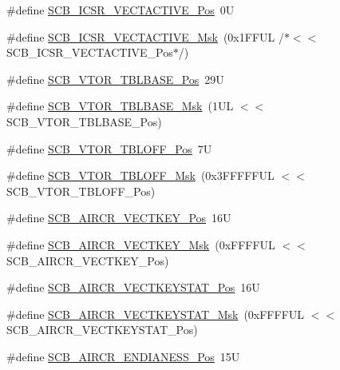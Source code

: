 \begin{DoxyCompactItemize}
\item 
\#define \hyperlink{group___c_m_s_i_s___s_c_b_gae4f602c7c5c895d5fb687b71b0979fc3}{S\-C\-B\-\_\-\-I\-C\-S\-R\-\_\-\-V\-E\-C\-T\-A\-C\-T\-I\-V\-E\-\_\-\-Pos}~0\-U
\item 
\#define \hyperlink{group___c_m_s_i_s___s_c_b_ga5533791a4ecf1b9301c883047b3e8396}{S\-C\-B\-\_\-\-I\-C\-S\-R\-\_\-\-V\-E\-C\-T\-A\-C\-T\-I\-V\-E\-\_\-\-Msk}~(0x1\-F\-F\-U\-L /$\ast$$<$$<$ S\-C\-B\-\_\-\-I\-C\-S\-R\-\_\-\-V\-E\-C\-T\-A\-C\-T\-I\-V\-E\-\_\-\-Pos$\ast$/)
\item 
\#define \hyperlink{group___c_m_s_i_s___s_c_b_gad9720a44320c053883d03b883b955751}{S\-C\-B\-\_\-\-V\-T\-O\-R\-\_\-\-T\-B\-L\-B\-A\-S\-E\-\_\-\-Pos}~29\-U
\item 
\#define \hyperlink{group___c_m_s_i_s___s_c_b_ga778dd0ba178466b2a8877a6b8aa345ee}{S\-C\-B\-\_\-\-V\-T\-O\-R\-\_\-\-T\-B\-L\-B\-A\-S\-E\-\_\-\-Msk}~(1\-U\-L $<$$<$ S\-C\-B\-\_\-\-V\-T\-O\-R\-\_\-\-T\-B\-L\-B\-A\-S\-E\-\_\-\-Pos)
\item 
\#define \hyperlink{group___c_m_s_i_s___s_c_b_gac6a55451ddd38bffcff5a211d29cea78}{S\-C\-B\-\_\-\-V\-T\-O\-R\-\_\-\-T\-B\-L\-O\-F\-F\-\_\-\-Pos}~7\-U
\item 
\#define \hyperlink{group___c_m_s_i_s___s_c_b_ga75e395ed74042923e8c93edf50f0996c}{S\-C\-B\-\_\-\-V\-T\-O\-R\-\_\-\-T\-B\-L\-O\-F\-F\-\_\-\-Msk}~(0x3\-F\-F\-F\-F\-F\-U\-L $<$$<$ S\-C\-B\-\_\-\-V\-T\-O\-R\-\_\-\-T\-B\-L\-O\-F\-F\-\_\-\-Pos)
\item 
\#define \hyperlink{group___c_m_s_i_s___s_c_b_gaaa27c0ba600bf82c3da08c748845b640}{S\-C\-B\-\_\-\-A\-I\-R\-C\-R\-\_\-\-V\-E\-C\-T\-K\-E\-Y\-\_\-\-Pos}~16\-U
\item 
\#define \hyperlink{group___c_m_s_i_s___s_c_b_ga90c7cf0c490e7ae55f9503a7fda1dd22}{S\-C\-B\-\_\-\-A\-I\-R\-C\-R\-\_\-\-V\-E\-C\-T\-K\-E\-Y\-\_\-\-Msk}~(0x\-F\-F\-F\-F\-U\-L $<$$<$ S\-C\-B\-\_\-\-A\-I\-R\-C\-R\-\_\-\-V\-E\-C\-T\-K\-E\-Y\-\_\-\-Pos)
\item 
\#define \hyperlink{group___c_m_s_i_s___s_c_b_gaec404750ff5ca07f499a3c06b62051ef}{S\-C\-B\-\_\-\-A\-I\-R\-C\-R\-\_\-\-V\-E\-C\-T\-K\-E\-Y\-S\-T\-A\-T\-\_\-\-Pos}~16\-U
\item 
\#define \hyperlink{group___c_m_s_i_s___s_c_b_gabacedaefeefc73d666bbe59ece904493}{S\-C\-B\-\_\-\-A\-I\-R\-C\-R\-\_\-\-V\-E\-C\-T\-K\-E\-Y\-S\-T\-A\-T\-\_\-\-Msk}~(0x\-F\-F\-F\-F\-U\-L $<$$<$ S\-C\-B\-\_\-\-A\-I\-R\-C\-R\-\_\-\-V\-E\-C\-T\-K\-E\-Y\-S\-T\-A\-T\-\_\-\-Pos)
\item 
\#define \hyperlink{group___c_m_s_i_s___s_c_b_gad31dec98fbc0d33ace63cb1f1a927923}{S\-C\-B\-\_\-\-A\-I\-R\-C\-R\-\_\-\-E\-N\-D\-I\-A\-N\-E\-S\-S\-\_\-\-Pos}~15\-U

\end{DoxyCompactItemize}
